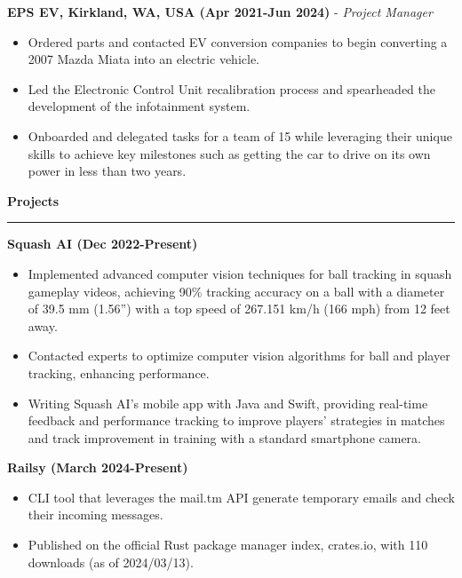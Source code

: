 \documentclass[10pt]{article}
\begin{document}
\textbf{EPS EV, Kirkland, WA, USA (Apr 2021-Jun 2024)} - \textit{Project Manager}
\begin{itemize}
    \small %
    \setlength{\itemsep}{-1pt} %
    \setlength{\parskip}{0pt} %
    \item Ordered parts and contacted EV conversion companies to begin converting a 2007 Mazda Miata into an electric vehicle.
    \item Led the Electronic Control Unit recalibration process and spearheaded the development of the infotainment system.
    \item Onboarded and delegated tasks for a team of 15 while leveraging their unique skills to achieve key milestones such as getting the car to drive on its own power in less than two years.
\end{itemize}

\noindent
\textbf{Projects} \\
\rule{\textwidth}{0.4pt} %

\textbf{Squash AI (Dec 2022-Present)}
\begin{itemize}
    \small %
    \setlength{\itemsep}{-1pt} %
    \setlength{\parskip}{0pt} %
    \item Implemented advanced computer vision techniques for ball tracking in squash gameplay videos, achieving 90\% tracking accuracy on a ball with a diameter of 39.5 mm (1.56”) with a top speed of 267.151 km/h (166 mph) from 12 feet away.
    \item Contacted experts to optimize computer vision algorithms for ball and player tracking, enhancing performance.
    \item Writing Squash AI’s mobile app with Java and Swift, providing real-time feedback and performance tracking to improve players' strategies in matches and track improvement in training with a standard smartphone camera.
\end{itemize}

\textbf{Railsy (March 2024-Present)}
\begin{itemize}
    \small %
    \setlength{\itemsep}{-1pt} %
    \setlength{\parskip}{0pt} %
    \item CLI tool that leverages the mail.tm API generate temporary emails and check their incoming messages.
    \item Published on the official Rust package manager index, crates.io, with 110 downloads (as of 2024/03/13).
\end{itemize}
\end{document}
